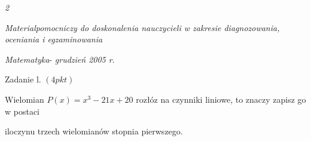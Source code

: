 \documentclass[a4paper,12pt]{article}
\begin{document}
{\it 2}

{\it Materialpomocniczy do doskonalenia nauczycieli w zakresie diagnozowania, oceniania i egzaminowania}

{\it Matematyka}- {\it grudzień 2005 r}.

Zadanie l. $(4pkt)$

Wielomian $P(x)=x^{3}-21x+20$ rozłóz na czynniki liniowe, to znaczy zapisz go w postaci

iloczynu trzech wielomianów stopnia pierwszego.
\end{document}
